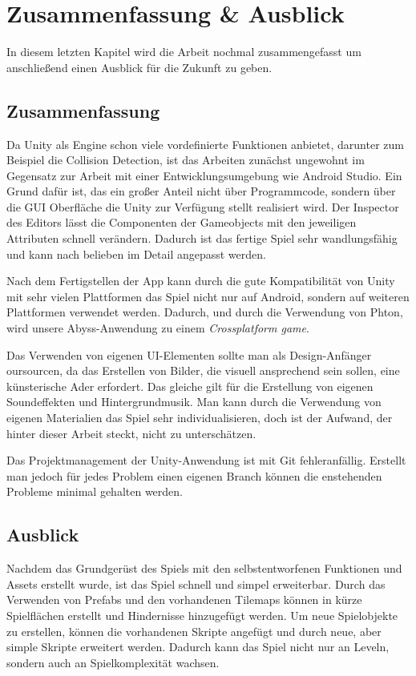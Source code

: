 \chapter{Zusammenfassung \& Ausblick}
\label{cha:zusammenfassungAusblick}
In diesem letzten Kapitel wird die Arbeit nochmal zusammengefasst um anschließend einen Ausblick für die Zukunft zu geben.

\section{Zusammenfassung}
\label{sec:grundlagen:zusammenfassung}
Da Unity als Engine schon viele vordefinierte Funktionen anbietet, darunter zum Beispiel die Collision Detection, ist das Arbeiten zunächst ungewohnt im Gegensatz zur Arbeit mit einer Entwicklungsumgebung wie Android Studio. Ein Grund dafür ist, das ein großer Anteil nicht über Programmcode, sondern über die GUI Oberfläche die Unity zur Verfügung stellt realisiert wird. Der Inspector des Editors lässt die Componenten der Gameobjects mit den jeweiligen Attributen schnell verändern. Dadurch ist das fertige Spiel sehr wandlungsfähig und kann nach belieben im Detail angepasst werden. 

Nach dem Fertigstellen der App kann durch die gute Kompatibilität von Unity mit sehr vielen Plattformen das Spiel nicht nur auf Android, sondern auf weiteren Plattformen verwendet werden. Dadurch, und durch die Verwendung von Phton, wird unsere Abyss-Anwendung zu einem \textit{Crossplatform game}.

Das Verwenden von eigenen UI-Elementen sollte man als Design-Anfänger oursourcen, da das Erstellen von Bilder, die visuell ansprechend sein sollen, eine künsterische Ader erfordert. Das gleiche gilt für die Erstellung von eigenen Soundeffekten und Hintergrundmusik. Man kann durch die Verwendung von eigenen Materialien das Spiel sehr individualisieren, doch ist der Aufwand, der hinter dieser Arbeit steckt, nicht zu unterschätzen. 

Das Projektmanagement der Unity-Anwendung ist mit Git fehleranfällig. Erstellt man jedoch für jedes Problem einen eigenen Branch können die enstehenden Probleme minimal gehalten werden.

\section{Ausblick}
\label{sec:grundlagen:ausblick}
Nachdem das Grundgerüst des Spiels mit den selbstentworfenen Funktionen und Assets erstellt wurde, ist das Spiel schnell und simpel erweiterbar. Durch das Verwenden von Prefabs und den vorhandenen Tilemaps können in kürze Spielflächen erstellt und Hindernisse hinzugefügt werden. Um neue Spielobjekte zu erstellen, können die vorhandenen Skripte angefügt und durch neue, aber simple Skripte erweitert werden. Dadurch kann das Spiel nicht nur an Leveln, sondern auch an Spielkomplexität wachsen.